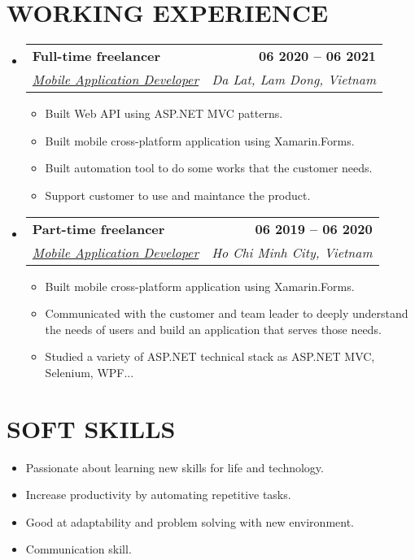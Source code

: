 \documentclass[letterpaper,11pt]{article}
\makeatletter
\newcommand{\resumeItem}[1]{
  \item\small{
    {#1 \vspace{-2pt}}
  }
}
\newcommand{\resumeSubheading}[4]{
  \vspace{-2pt}\item
    \begin{tabular*}{1.0\textwidth}[t]{l@{\extracolsep{\fill}}r}
      \textbf{\large#1} & \textbf{\small #2} \\
      \textit{\large#3} & \textit{\small #4} \\
      
    \end{tabular*}\vspace{-7pt}
}
\newcommand{\resumeSubHeadingListStart}{\begin{itemize}[leftmargin=0.0in, label={}]}
\newcommand{\resumeSubHeadingListEnd}{\end{itemize}}
\newcommand{\resumeItemListStart}{\begin{itemize}}
\newcommand{\resumeItemListEnd}{\end{itemize}\vspace{-5pt}}
\makeatother
\begin{document}
\section{WORKING EXPERIENCE}
  \resumeSubHeadingListStart

    \resumeSubheading
      {Full-time freelancer \href{https://phnaharris.github.io/}{\raisebox{-0.1\height}\faExternalLink }}{06 2020 -- 06 2021} 
      {\underline{Mobile Application Developer}}{Da Lat, Lam Dong, Vietnam}
      \resumeItemListStart
        \resumeItem{\normalsize{Built Web API using ASP.NET MVC patterns.}}
        \resumeItem{\normalsize{Built mobile cross-platform application using Xamarin.Forms.}}
        \resumeItem{\normalsize{Built automation tool to do some works that the customer needs.}}
        \resumeItem{\normalsize{Support customer to use and maintance the product.}}
      \resumeItemListEnd  

    \resumeSubheading
      {Part-time freelancer \href{https://phnaharris.github.io/}{\raisebox{-0.1\height}\faExternalLink }}{06 2019 -- 06 2020} 
      {\underline{Mobile Application Developer}}{Ho Chi Minh City, Vietnam}
      \resumeItemListStart
        \resumeItem{\normalsize{Built mobile cross-platform application using Xamarin.Forms.}}
        \resumeItem{\normalsize{Communicated with the customer and team leader to deeply understand the needs of users and build an application that serves those needs.}}
        \resumeItem{\normalsize{Studied a variety of ASP.NET technical stack as ASP.NET MVC, Selenium, WPF...}}

      \resumeItemListEnd  

  \resumeSubHeadingListEnd
\vspace{-12pt}


\section{SOFT SKILLS}
 \begin{itemize}[leftmargin=0.33in, parsep=-2pt]
    \item Passionate about learning new skills for life and technology.
    \item Increase productivity by automating repetitive tasks.
    \item Good at adaptability and problem solving with new
    environment.
    \item Communication skill.
 \end{itemize}
 \vspace{-15pt}
\end{document}
